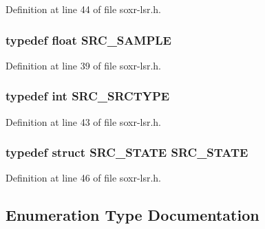 Definition at line 44 of file soxr-\/lsr.\+h.

\subsubsection[{\texorpdfstring{S\+R\+C\+\_\+\+S\+A\+M\+P\+LE}{SRC_SAMPLE}}]{\setlength{\rightskip}{0pt plus 5cm}typedef float {\bf S\+R\+C\+\_\+\+S\+A\+M\+P\+LE}}\hypertarget{soxr-lsr_8h_aeed0ef55cbeaa78637727866e9ea4be8}{}\label{soxr-lsr_8h_aeed0ef55cbeaa78637727866e9ea4be8}


Definition at line 39 of file soxr-\/lsr.\+h.

\subsubsection[{\texorpdfstring{S\+R\+C\+\_\+\+S\+R\+C\+T\+Y\+PE}{SRC_SRCTYPE}}]{\setlength{\rightskip}{0pt plus 5cm}typedef {\bf int} {\bf S\+R\+C\+\_\+\+S\+R\+C\+T\+Y\+PE}}\hypertarget{soxr-lsr_8h_a2e2a328e11ac7ce361f7e02d854a172f}{}\label{soxr-lsr_8h_a2e2a328e11ac7ce361f7e02d854a172f}


Definition at line 43 of file soxr-\/lsr.\+h.

\subsubsection[{\texorpdfstring{S\+R\+C\+\_\+\+S\+T\+A\+TE}{SRC_STATE}}]{\setlength{\rightskip}{0pt plus 5cm}typedef struct {\bf S\+R\+C\+\_\+\+S\+T\+A\+TE} {\bf S\+R\+C\+\_\+\+S\+T\+A\+TE}}\hypertarget{soxr-lsr_8h_a9bbd7df535efdabb27f27451f387e0d8}{}\label{soxr-lsr_8h_a9bbd7df535efdabb27f27451f387e0d8}


Definition at line 46 of file soxr-\/lsr.\+h.



\subsection{Enumeration Type Documentation}
